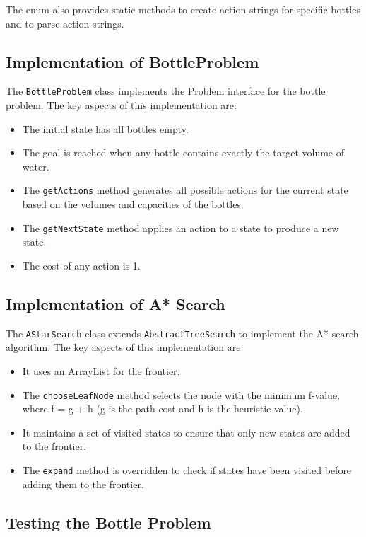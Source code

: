 \documentclass[12pt,a4paper]{article}
\begin{document}
The enum also provides static methods to create action strings for specific bottles and to parse action strings.

\subsection{Implementation of BottleProblem}

The \texttt{BottleProblem} class implements the Problem interface for the bottle problem. The key aspects of this implementation are:

\begin{itemize}
    \item The initial state has all bottles empty.
    \item The goal is reached when any bottle contains exactly the target volume of water.
    \item The \texttt{getActions} method generates all possible actions for the current state based on the volumes and capacities of the bottles.
    \item The \texttt{getNextState} method applies an action to a state to produce a new state.
    \item The cost of any action is 1.
\end{itemize}

\subsection{Implementation of A* Search}

The \texttt{AStarSearch} class extends \texttt{AbstractTreeSearch} to implement the A* search algorithm. The key aspects of this implementation are:

\begin{itemize}
    \item It uses an ArrayList for the frontier.
    \item The \texttt{chooseLeafNode} method selects the node with the minimum f-value, where f = g + h (g is the path cost and h is the heuristic value).
    \item It maintains a set of visited states to ensure that only new states are added to the frontier.
    \item The \texttt{expand} method is overridden to check if states have been visited before adding them to the frontier.
\end{itemize}

\subsection{Testing the Bottle Problem}
\end{document}
